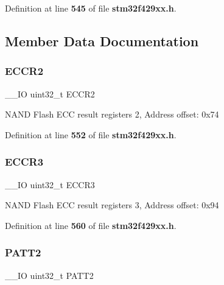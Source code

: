 Definition at line \textbf{ 545} of file \textbf{ stm32f429xx.\+h}.



\subsection{Member Data Documentation}
\mbox{\label{structFMC__Bank2__3__TypeDef_a05a47a1664adc7a3db3fa3e83fe883b4}} 
\subsubsection{E\+C\+C\+R2}
{\footnotesize\ttfamily \+\_\+\+\_\+\+IO uint32\+\_\+t E\+C\+C\+R2}

N\+A\+ND Flash E\+CC result registers 2, Address offset\+: 0x74 

Definition at line \textbf{ 552} of file \textbf{ stm32f429xx.\+h}.

\mbox{\label{structFMC__Bank2__3__TypeDef_a6062be7dc144c07e01c303cb49d69ce2}} 
\subsubsection{E\+C\+C\+R3}
{\footnotesize\ttfamily \+\_\+\+\_\+\+IO uint32\+\_\+t E\+C\+C\+R3}

N\+A\+ND Flash E\+CC result registers 3, Address offset\+: 0x94 

Definition at line \textbf{ 560} of file \textbf{ stm32f429xx.\+h}.

\mbox{\label{structFMC__Bank2__3__TypeDef_a9c1bc909ec5ed32df45444488ea6668b}} 
\subsubsection{P\+A\+T\+T2}
{\footnotesize\ttfamily \+\_\+\+\_\+\+IO uint32\+\_\+t P\+A\+T\+T2}

